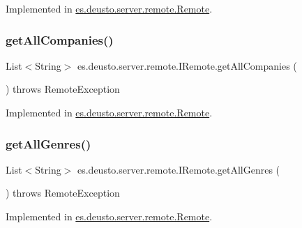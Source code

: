 Implemented in \hyperlink{classes_1_1deusto_1_1server_1_1remote_1_1_remote_ad9f8ad426b1162504b7b39eb1c86d2a3}{es.\+deusto.\+server.\+remote.\+Remote}.

\mbox{\label{interfacees_1_1deusto_1_1server_1_1remote_1_1_i_remote_a79aad360068d216b63b8afadcc6bcc92}} 
\subsubsection{\texorpdfstring{get\+All\+Companies()}{getAllCompanies()}}
{\footnotesize\ttfamily List$<$String$>$ es.\+deusto.\+server.\+remote.\+I\+Remote.\+get\+All\+Companies (\begin{DoxyParamCaption}{ }\end{DoxyParamCaption}) throws Remote\+Exception}



Implemented in \hyperlink{classes_1_1deusto_1_1server_1_1remote_1_1_remote_aab476fc9723873e8f85296602d34a97a}{es.\+deusto.\+server.\+remote.\+Remote}.

\mbox{\label{interfacees_1_1deusto_1_1server_1_1remote_1_1_i_remote_a90995befbd81e0781056f75645997fe9}} 
\subsubsection{\texorpdfstring{get\+All\+Genres()}{getAllGenres()}}
{\footnotesize\ttfamily List$<$String$>$ es.\+deusto.\+server.\+remote.\+I\+Remote.\+get\+All\+Genres (\begin{DoxyParamCaption}{ }\end{DoxyParamCaption}) throws Remote\+Exception}



Implemented in \hyperlink{classes_1_1deusto_1_1server_1_1remote_1_1_remote_a7a276118f167e088bbb56d962b2cc18f}{es.\+deusto.\+server.\+remote.\+Remote}.

